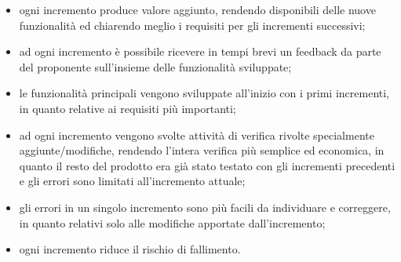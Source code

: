	\begin{itemize}
		\item ogni incremento produce valore aggiunto, rendendo disponibili delle nuove funzionalità ed chiarendo meglio i requisiti per gli incrementi successivi;
		\item ad ogni incremento è possibile ricevere in tempi brevi un feedback da parte del proponente sull'insieme delle funzionalità sviluppate;
		\item le funzionalità principali vengono sviluppate all'inizio con i primi incrementi, in quanto relative ai requisiti più importanti;
		\item ad ogni incremento vengono svolte attività di verifica rivolte specialmente aggiunte/modifiche, rendendo l'intera verifica più semplice ed economica, in quanto il resto del prodotto era già stato testato con gli incrementi precedenti e gli errori sono limitati all'incremento attuale;
		\item gli errori in un singolo incremento sono più facili da individuare e correggere, in quanto relativi solo alle modifiche apportate dall'incremento;
		\item ogni incremento riduce il rischio di fallimento.
	\end{itemize}
